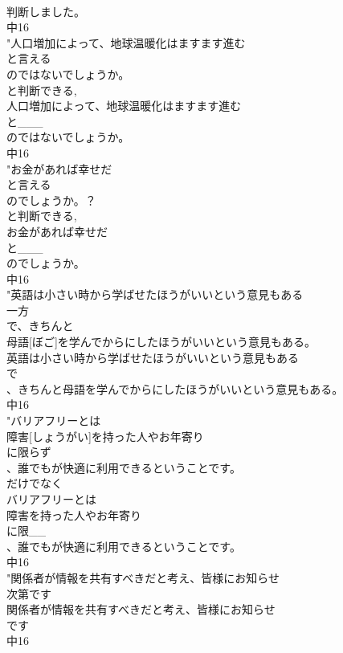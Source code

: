 \documentclass[8pt]{extreport}
\begin{document}
\begin{CJK}{UTF8}{min}
\\	判断しました。
\\	中16
\\	"人口増加によって、地球温暖化はますます進む
\\	と言える
\\	のではないでしょうか。
\\	と判断できる, 
\\	人口増加によって、地球温暖化はますます進む
\\	と___
\\	のではないでしょうか。
\\	中16
\\	"お金があれば幸せだ
\\	と言える
\\	のでしょうか。？
\\	と判断できる, 
\\	お金があれば幸せだ
\\	と___
\\	のでしょうか。
\\	中16
\\	"英語は小さい時から学ばせたほうがいいという意見もある
\\	一方
\\	で、きちんと
\\	母語[ぼご]を学んでからにしたほうがいいという意見もある。
\\	英語は小さい時から学ばせたほうがいいという意見もある
\\	で
\\	、きちんと母語を学んでからにしたほうがいいという意見もある。
\\	中16
\\	"バリアフリーとは
\\	障害[しょうがい]を持った人やお年寄り
\\	に限らず
\\	、誰でもが快適に利用できるということです。
\\	だけでなく　
\\	バリアフリーとは
\\	障害を持った人やお年寄り
\\	に限__
\\	、誰でもが快適に利用できるということです。
\\	中16
\\	"関係者が情報を共有すべきだと考え、皆様にお知らせ
\\	次第です
\\	関係者が情報を共有すべきだと考え、皆様にお知らせ
\\	です
\\	中16

\end{CJK}
\end{document}
